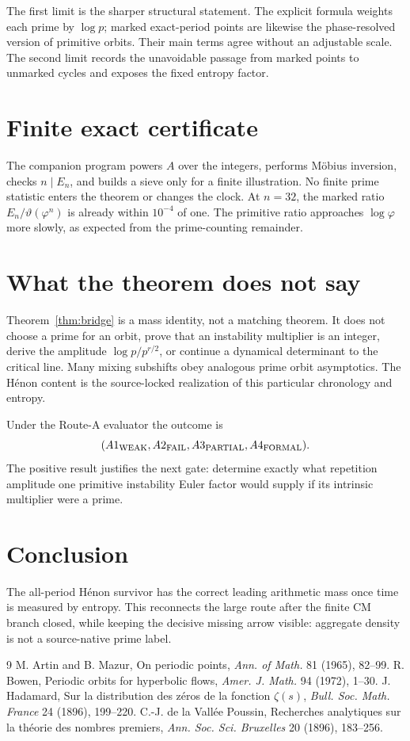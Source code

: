 \documentclass[11pt]{article}
\theoremstyle{remark}\newtheorem{remark}[theorem]{Remark}
\begin{document}
The first limit is the sharper structural statement.  The explicit formula
weights each prime by $\log p$; marked exact-period points are likewise the
phase-resolved version of primitive orbits.  Their main terms agree without
an adjustable scale.  The second limit records the unavoidable passage from
marked points to unmarked cycles and exposes the fixed entropy factor.

\section{Finite exact certificate}
The companion program powers $A$ over the integers, performs M\"obius
inversion, checks $n\mid E_n$, and builds a sieve only for a finite
illustration.  No finite prime statistic enters the theorem or changes the
clock.  At $n=32$, the marked ratio $E_n/\vartheta(\varphi^n)$ is already
within $10^{-4}$ of one.  The primitive ratio approaches
$\log\varphi$ more slowly, as expected from the prime-counting remainder.

\section{What the theorem does not say}
Theorem~\ref{thm:bridge} is a mass identity, not a matching theorem.  It
does not choose a prime for an orbit, prove that an instability multiplier is
an integer, derive the amplitude $\log p/p^{r/2}$, or continue a dynamical
determinant to the critical line.  Many mixing subshifts obey analogous prime
orbit asymptotics.  The H\'enon content is the source-locked realization of
this particular chronology and entropy.

Under the Route-A evaluator the outcome is
\[
(A1_{\rm WEAK},A2_{\rm FAIL},A3_{\rm PARTIAL},A4_{\rm FORMAL}).
\]
The positive result justifies the next gate: determine exactly what
repetition amplitude one primitive instability Euler factor would supply if
its intrinsic multiplier were a prime.

\section{Conclusion}
The all-period H\'enon survivor has the correct leading arithmetic mass once
time is measured by entropy.  This reconnects the large route after the
finite CM branch closed, while keeping the decisive missing arrow visible:
aggregate density is not a source-native prime label.

\begin{thebibliography}{9}
M. Artin and B. Mazur, On periodic points, \emph{Ann. of Math.} 81 (1965), 82--99.
R. Bowen, Periodic orbits for hyperbolic flows, \emph{Amer. J. Math.} 94 (1972), 1--30.
J. Hadamard, Sur la distribution des z\'eros de la fonction $\zeta(s)$, \emph{Bull. Soc. Math. France} 24 (1896), 199--220.
C.-J. de la Vall\'ee Poussin, Recherches analytiques sur la th\'eorie des nombres premiers, \emph{Ann. Soc. Sci. Bruxelles} 20 (1896), 183--256.
\end{thebibliography}
\end{document}
